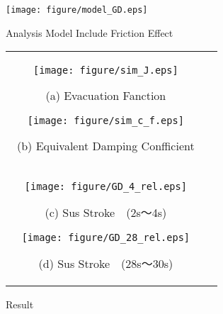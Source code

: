 \documentclass[a4paper,12pt]{article_vdlab_sotsuron}
\begin{document}
\vspace*{2mm}
\begin{figure}[h]
  \begin{center}
    \texttt{[image: figure/model\_GD.eps]}
    \vspace*{2mm}
    \caption{Analysis Model Include Friction Effect}
    \label{fig:sim_GD_model}
  \end{center}
\end{figure}

\begin{figure}[h!]
    \begin{tabular}{cc}
      \begin{minipage}{0.5\hsize}
        \centering
        \texttt{[image: figure/sim\_J.eps]}
        \begin{center}
          \vspace{-4mm}
          \ (a) Evacuation Fanction\
        \end{center}
      \end{minipage}
      \begin{minipage}{0.5\hsize}
        \centering
        \texttt{[image: figure/sim\_c\_f.eps]}
        \begin{center}
          \vspace{-4mm}
          \ (b)  Equivalent Damping Confficient\
        \end{center}
      \end{minipage}\\
        \begin{minipage}{0.5\hsize}
          \centering
          \texttt{[image: figure/GD\_4\_rel.eps]}
          \begin{center}
            \vspace{-4mm}
            \ (c) Sus Stroke　(2s～4s)\
          \end{center}
        \end{minipage}
        \begin{minipage}{0.5\hsize}
          \centering
          \texttt{[image: figure/GD\_28\_rel.eps]}
          \begin{center}
            \vspace{-4mm}
            \ (d) Sus Stroke　(28s～30s)\
          \end{center}
        \end{minipage}
      \end{tabular}
      \vspace{1mm}
    \caption{Result}
    \label{fig:sim_GD_test}
\end{figure}
\end{document}
